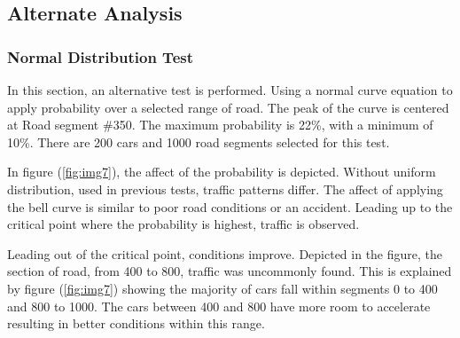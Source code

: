 \documentclass[12pt]{extarticle}
\begin{document}
\subsection{Alternate Analysis}
\subsubsection{Normal Distribution Test}


In this section, an alternative test is performed. Using a normal curve equation to apply probability over a selected range of road. The peak of the curve is centered at Road segment \#350. The maximum probability is 22\%, with a minimum of 10\%. There are 200 cars and 1000 road segments selected for this test.

In figure (\ref{fig:img7}), the affect of the probability is depicted. Without uniform distribution, used in previous tests, traffic patterns differ. The affect of applying the bell curve is similar to poor road conditions or an accident. Leading up to the critical point where the probability is highest, traffic is observed. 

Leading out of the critical point, conditions improve. Depicted in the figure, the section of road, from 400 to 800, traffic was uncommonly found. This is explained by figure (\ref{fig:img7}) showing the majority of cars fall within segments 0 to 400 and 800 to 1000. The cars between 400 and 800 have more room to accelerate resulting in better conditions within this range.
\end{document}
